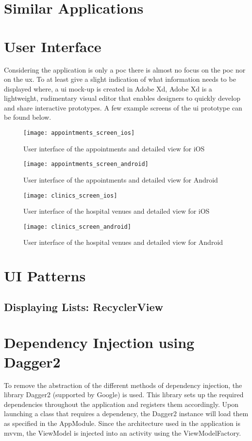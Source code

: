 \section{Similar Applications}
\section{User Interface}
Considering the application is only a \acrshort{poc} there is almost no focus on the \acrlong{poc} nor on the \acrfull{ux}. To at least give a slight indication of what information needs to be displayed where, a \acrshort{ui} mock-up is created in Adobe Xd, Adobe Xd is a lightweight, rudimentary visual editor that enables designers to quickly develop and share interactive prototypes. A few example screens of the \acrshort{ui} prototype can be found below.
\begin{figure}[H]
\centering
\texttt{[image: appointments\_screen\_ios]}
\caption{User interface of the appointments and detailed view for iOS}
\end{figure}
\begin{figure}[H]
\centering
\texttt{[image: appointments\_screen\_android]}
\caption{User interface of the appointments and detailed view for Android}
\end{figure}
\begin{figure}[H]
\centering
\texttt{[image: clinics\_screen\_ios]}
\caption{User interface of the hospital venues and detailed view for iOS}
\end{figure}
\begin{figure}[H]
\centering
\texttt{[image: clinics\_screen\_android]}
\caption{User interface of the hospital venues and detailed view for Android}
\end{figure}
\section{UI Patterns}
\subsection{Displaying Lists: RecyclerView}
\cite{https://developer.android.com/guide/topics/ui/layout/recyclerview}
\section{Dependency Injection using Dagger2}
To remove the abstraction of the different methods of dependency injection, the library Dagger2 (supported by Google) is used. This library sets up the required dependencies throughout the application and registers them accordingly. Upon launching a class that requires a dependency, the Dagger2 instance will load them as specified in the AppModule. Since the architecture used in the application is \acrshort{mvvm}, the ViewModel is injected into an activity using the ViewModelFactory.

